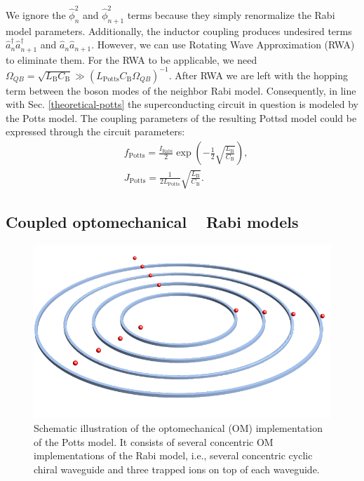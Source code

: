 \documentclass[reprint, aps, prx, amsmath, amssymb, longbibliography, superscriptaddress]{revtex4-2}
\DeclareMathOperator{\Zthree}{\mathbb{Z}_3}
\begin{document}
We ignore the $ \hat \phi_n^2 $ and $ \hat \phi_{n+1}^2 $ terms because they simply renormalize the Rabi model parameters. Additionally, the inductor coupling produces undesired terms $\hat a^{\dagger}_n \hat a^{\dagger}_{n+1}$ and $\hat a_n \hat a_{n+1}$. However, we can use Rotating Wave Approximation (RWA) to eliminate them. For the RWA to be applicable, we need $\Omega_{QB} = \sqrt{L_{\text{B}} C_{\text{B}}} \gg (L_{\text{Potts}} C_{\text{B}} \Omega_{QB})^{-1}$. After RWA we are left with the hopping term between the boson modes of the neighbor Rabi model. Consequently, in line with Sec. \ref{theoretical-potts} the superconducting circuit in question is modeled by the Potts model. The coupling parameters of the resulting Pottsd model could be expressed through the circuit parameters:
\begin{equation}
\begin{aligned}
    &f_{\text{Potts}} = \frac{I_{\text{Rabi}}}{2} \exp\left(-\frac{1}{2}\sqrt{\frac{L_{\text{B}}}{C_{\text{B}}}}\right), \\
    &J_{\text{Potts}} = \frac{1}{2L_{\text{Potts}}}\sqrt{\frac{L_{\text{B}}}{C_{\text{B}}}}. 
\end{aligned}
\end{equation}


\subsection{Coupled optomechanical \texorpdfstring{$\Zthree$}{Z3} Rabi models}

\begin{figure}[t]
    \centering
    \includegraphics[width = 0.8 \linewidth]{pics/optomechanical_Potts_pic.pdf}
    \caption{Schematic illustration of the optomechanical (OM) implementation of the Potts model. It consists of several concentric OM implementations of the Rabi model, i.e., several concentric cyclic chiral waveguide and three trapped ions on top of each waveguide.}
    \label{fig:optomechanical-potts}
\end{figure}
\end{document}
